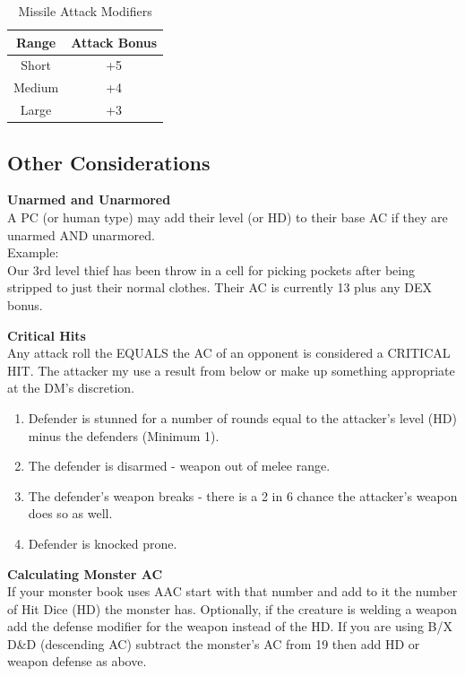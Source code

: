 \documentclass[letterpaper,sansserif,tightsqueeze]{rpg-module}
\begin{document}
\begin{table}[h!]
	\centering
	\begin{tabular}{|c|c|}
		\hline
		\textbf{Range}	& \textbf{Attack Bonus}	\\ \hline
		Short	& +5 	\\ \hline
		Medium	& +4 	\\ \hline
		Large	& +3 	\\ \hline
	\end{tabular}
	\caption{Missile Attack Modifiers}
	\label{table:MissileAttackModifiers}
\end{table}

\vspace{0.5cm}

\subsection*{Other Considerations}
\label{subsection:MonsterAC}
\textbf{Unarmed and Unarmored}\\
A PC (or human type) may add their level (or HD) to their base AC if they are unarmed AND unarmored.\\
Example:\\
Our 3rd level thief has been throw in a cell for picking pockets after being stripped to just their normal clothes. Their AC is currently 13 plus any DEX bonus.

\textbf{Critical Hits}\\
Any attack roll the EQUALS the AC of an opponent is considered a CRITICAL HIT. The attacker my use a result from below or make up something appropriate at the DM’s discretion.
\begin{enumerate}
	\item Defender is stunned for a number of rounds equal to the attacker’s level (HD) minus the defenders (Minimum 1).
	\item The defender is disarmed - weapon out of melee range.
	\item The defender’s weapon breaks - there is a 2 in 6 chance the attacker’s weapon does so as well.
	\item Defender is knocked prone.
\end{enumerate}

\textbf{Calculating Monster AC}\\
If your monster book uses AAC start with that number and add to it the number of Hit Dice (HD) the monster has. Optionally, if the creature is welding a weapon add the defense modifier for the weapon instead of the HD. If you are using B/X D\&D (descending AC) subtract the monster’s AC from 19 then add HD or weapon defense as above.
\end{document}
